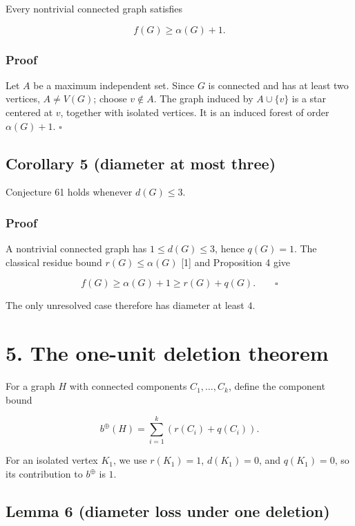 \documentclass[
  11pt,
  letterpaper,
]{article}
\begin{document}
Every nontrivial connected graph satisfies

\[
f(G)\ge\alpha(G)+1.
\]

\subsubsection{Proof}\label{proof-3}

Let \(A\) be a maximum independent set. Since \(G\) is connected and has
at least two vertices, \(A\ne V(G)\); choose \(v\notin A\). The graph
induced by \(A\cup\{v\}\) is a star centered at \(v\), together with
isolated vertices. It is an induced forest of order \(\alpha(G)+1\).
\(\square\)

\subsection{Corollary 5 (diameter at most
three)}\label{corollary-5-diameter-at-most-three}

Conjecture 61 holds whenever \(d(G)\le3\).

\subsubsection{Proof}\label{proof-4}

A nontrivial connected graph has \(1\le d(G)\le3\), hence \(q(G)=1\).
The classical residue bound \(r(G)\le\alpha(G)\) {[}1{]} and Proposition
4 give

\[
f(G)\ge\alpha(G)+1\ge r(G)+q(G).
\qquad\square
\]

The only unresolved case therefore has diameter at least \(4\).

\section{5. The one-unit deletion
theorem}\label{the-one-unit-deletion-theorem}

For a graph \(H\) with connected components \(C_1,\ldots,C_k\), define
the component bound

\[
b^\oplus(H)=
\sum_{i=1}^k
\left(
  r(C_i)+q(C_i)
\right).
\]

For an isolated vertex \(K_1\), we use \(r(K_1)=1\), \(d(K_1)=0\), and
\(q(K_1)=0\), so its contribution to \(b^\oplus\) is \(1\).

\subsection{Lemma 6 (diameter loss under one
deletion)}\label{lemma-6-diameter-loss-under-one-deletion}
\end{document}
